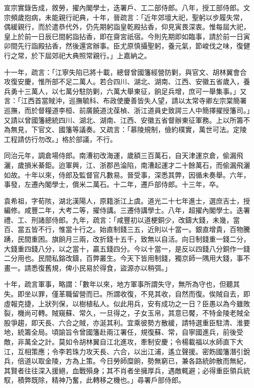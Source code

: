 \begin{pinyinscope}
宣宗實錄告成，敘勞，擢內閣學士，迭署戶、工二部侍郎。八年，授工部侍郎。文宗頻歲抱病，未能親行祀典，十年，晉疏言：「近年郊壇大祀，聖躬以步履失常，偶緩親行，而於遣恭代外，仍先期躬詣皇乾殿拈香，仰見寅畏深衷。惟每屆大祀，皇上於前一日辰巳間躬詣拈香，即在齋宮祇宿。今則先期即如臨事，請於前一日寅卯間先行詣殿拈香，然後還宮辦事。臣尤原慎攝聖躬，養元氣，節峻伐之味，復健行之常，於下屆郊祀大典照常親行。」上嘉納之。

十一年，疏言：「江寧失陷已將十載，總督曾國籓經營防剿，與官文、胡林翼會合攻復安慶，惟所部不足二萬人。若合四川、湖北、湖南、江西、安徽五省歲入，養兵勇十三萬人，以七萬分駐防剿，六萬大舉東征，餉足兵增，庶可一舉集事。」又言：「江西首當賊沖，巡撫毓科、布政使慶善皆失人望，請以太常寺卿左宗棠簡署巡撫，而於督糧道李桓、前廣饒道沈葆楨、浙江道員史致諤三人中簡擇擢授籓司。」又請以曾國籓總統四川、湖北、湖南、江西、安徽五省督辦東征軍務。上以所籌不為無見，下官文、國籓等議奏。又疏言：「慕陵規制，儉約樸實，萬世可法。定陵工程請仿行勿改。」格於部議，不行。

同治元年，調倉場侍郎。南漕初改海運，歲額三百萬石，自天津運京倉，偷漏飛灑，歲損米綦鉅。迨軍興，江、浙郡邑淪陷，南漕起運才二十餘萬石，而偷漏飛灑如故。十年以來，侍郎及監督官凡數易。晉受事，深悉其弊，因循未奏舉。六年，事發，左遷內閣學士，償米二萬石。十二年，遷戶部侍郎。十三年，卒。

袁希祖，字荀陔，湖北漢陽人，原籍浙江上虞。道光二十七年進士，選庶吉士，授編修。咸豐二年，大考二等，擢侍講。三遷侍講學士。八年，超擢內閣學士。迭署禮、工、刑諸部侍郎。九年，疏言：「咸豐初以道梗銅少，改鑄大錢，未幾，當百、當五皆不行，惟當十行之。始直制錢三五，近則以十當一。銀直增貴，百物騰踴，民間重困。旗餉月三兩，改折錢十五千，致無以自活。向日制錢重一錢二分，大錢重四錢八分，以之當十，贏五錢四分。今以十當一，是反以四錢八分銅作一錢二分用也。民間私鎔改鑄，百弊叢生。今天下皆用制錢，獨京師一隅用大錢，事不畫一。請悉復舊規，俾小民易於得食，盜源亦以稍弭。」

十年，疏言軍事，略謂：「數年以來，地方軍事所謂失守，無所為守也，但聽其失。即坐以罪，僅革職留營而已。所謂收復，不見其收，自然而復。俟賊自去，即虛報克捷，上狀列保，以樹植私人。似此用兵，安有成功之一日？臣愚以為今雖敗裂，機尚可轉。賊窺蘇、常久，一旦得之，子女玉帛，其意已饜，不特金陵老賊全股爭趨，即天長、六合之賊，亦涎其利。宜乘彼勢方散緩，請特選重臣駐清、淮要地，統籌全局。頃諭旨令曾國籓赴兩江署任，規復蘇、常，自寧國進兵，前後受敵，非萬全之計。莫如令胡林翼自江北進攻，牽制安慶；令楊載福以水師直下大江，互相策應；令李若珠力攻天長、六合，以出江浦，遙立聲援。密飭國籓潛引銳兵，倍道以取金陵，方為上策。今日勞師糜餉，勢無窮已，兼各路統帥散而無紀，其賢者往往深入援絕，血戰殞身；其不肖者坐擁厚兵，遇敵輒避；必得重臣領兵統馭，積弊既除，精神乃奮，此轉移之機也。」尋署戶部侍郎。


\end{pinyinscope}
